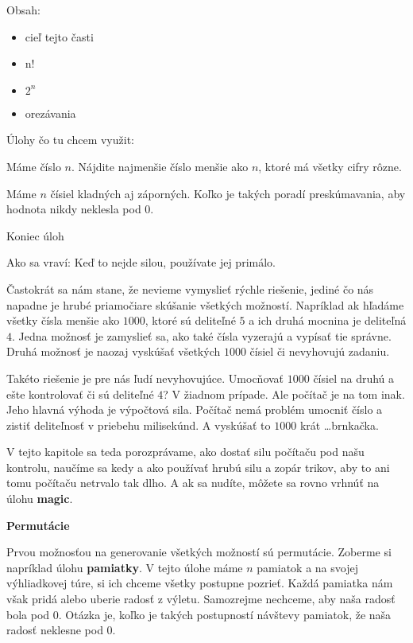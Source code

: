 




Obsah:
\begin{itemize}
    \item cieľ tejto časti
    \item n!
    \item $2^n$
    \item orezávania
\end{itemize}

Úlohy čo tu chcem využit:

Máme číslo $n$. Nájdite najmenšie číslo menšie ako $n$, ktoré má všetky cifry rôzne.

Máme $n$ čísiel kladných aj záporných. Koľko je takých poradí preskúmavania, aby hodnota nikdy
neklesla pod 0.

Koniec úloh

Ako sa vraví: Keď to nejde silou, používate jej primálo.

Častokrát sa nám stane, že nevieme vymyslieť rýchle riešenie, jediné čo nás napadne je hrubé
priamočiare skúšanie všetkých možností. Napríklad ak hľadáme všetky čísla menšie ako $1000$, ktoré
sú deliteľné $5$ a ich druhá mocnina je deliteľná $4$. Jedna možnosť je zamyslieť sa, ako také čísla
vyzerajú a vypísať tie správne. Druhá možnosť je naozaj vyskúšať všetkých $1000$ čísiel či
nevyhovujú zadaniu.

Takéto riešenie je pre nás ľudí nevyhovujúce. Umocňovať $1000$ čísiel na druhú a ešte kontrolovať či
sú deliteľné $4$? V žiadnom prípade. Ale počítač je na tom inak. Jeho hlavná výhoda je výpočtová
sila. Počítač nemá problém umocniť číslo a zistiť deliteľnosť v priebehu milisekúnd. A vyskúšať to
$1000$ krát \dots brnkačka.

V tejto kapitole sa teda porozprávame, ako dostať silu počítaču pod našu kontrolu, naučíme sa kedy a
ako používať hrubú silu a zopár trikov, aby to ani tomu počítaču netrvalo tak dlho. A ak sa nudíte,
môžete sa rovno vrhnúť na úlohu \textbf{magic}.

\textbf{Permutácie}

Prvou možnosťou na generovanie všetkých možností sú permutácie. Zoberme si napríklad úlohu
\textbf{pamiatky}. V tejto úlohe máme $n$ pamiatok a na svojej výhliadkovej túre, si ich chceme
všetky postupne pozrieť. Každá pamiatka nám však pridá alebo uberie radosť z výletu. Samozrejme
nechceme, aby naša radosť bola pod $0$. Otázka je, koľko je takých postupností návštevy pamiatok, že
naša radosť neklesne pod $0$.

